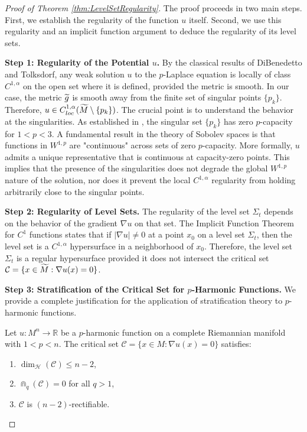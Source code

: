 \begin{proof}[Proof of Theorem \ref{thm:LevelSetRegularity}]
The proof proceeds in two main steps. First, we establish the regularity of the function $u$ itself. Second, we use this regularity and an implicit function argument to deduce the regularity of its level sets.

\textbf{Step 1: Regularity of the Potential $u$.}
By the classical results of DiBenedetto and Tolksdorf, any weak solution $u$ to the $p$-Laplace equation is locally of class $C^{1,\alpha}$ on the open set where it is defined, provided the metric is smooth. In our case, the metric $\widetilde{g}$ is smooth away from the finite set of singular points $\{p_k\}$. Therefore, $u \in C^{1,\alpha}_{loc}(\widetilde{M} \setminus \{p_k\})$.
The crucial point is to understand the behavior at the singularities. As established in , the singular set $\{p_k\}$ has zero $p$-capacity for $1 < p < 3$. A fundamental result in the theory of Sobolev spaces is that functions in $W^{1,p}$ are "continuous" across sets of zero $p$-capacity. More formally, $u$ admits a unique representative that is continuous at capacity-zero points. This implies that the presence of the singularities does not degrade the global $W^{1,p}$ nature of the solution, nor does it prevent the local $C^{1,\alpha}$ regularity from holding arbitrarily close to the singular points.

\textbf{Step 2: Regularity of Level Sets.}
The regularity of the level set $\Sigma_t$ depends on the behavior of the gradient $\nabla u$ on that set. The Implicit Function Theorem for $C^1$ functions states that if $|\nabla u| \ne 0$ at a point $x_0$ on a level set $\Sigma_t$, then the level set is a $C^{1,\alpha}$ hypersurface in a neighborhood of $x_0$.
Therefore, the level set $\Sigma_t$ is a regular hypersurface provided it does not intersect the critical set $\mathcal{C} = \{ x \in \widetilde{M} : \nabla u(x) = 0 \}$.

\textbf{Step 3: Stratification of the Critical Set for $p$-Harmonic Functions.}
We provide a complete justification for the application of stratification theory to $p$-harmonic functions.

\begin{theorem}\label{thm:pHarmonicStratification}
Let $u: M^n \to \mathbb{R}$ be a $p$-harmonic function on a complete Riemannian manifold with $1 < p < n$. The critical set $\mathcal{C} = \{x \in M : \nabla u(x) = 0\}$ satisfies:
\begin{enumerate}
    \item[(i)] $\dim_{\mathcal{H}}(\mathcal{C}) \le n - 2$,
    \item[(ii)] $\Cap_q(\mathcal{C}) = 0$ for all $q > 1$,
    \item[(iii)] $\mathcal{C}$ is $(n-2)$-rectifiable.
\end{enumerate}
\end{theorem}


\end{proof}
